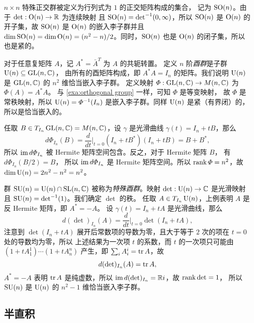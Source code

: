 \begin{example}[特殊正交群]
  $n\times n$ 特殊正交群被定义为行列式为 $1$ 的正交矩阵构成的集合，
  记为 $\operatorname{SO}(n)$。由于 $\det:\operatorname{O}(n)\to \mathbb{R}$ 为连续映射
  且 $\operatorname{SO}(n)=\det^{-1}(0,\infty)$，所以 $\operatorname{SO}(n)$ 是 $\operatorname{O}(n)$
  的开子集，故 $\operatorname{SO}(n)$ 是 $\operatorname{O}(n)$ 的嵌入李子群并且
  $\dim \operatorname{SO}(n)=\dim\operatorname{O}(n)=(n^2-n)/2$。同时，$\operatorname{SO}(n)$
  也是 $\operatorname{O}(n)$ 的闭子集，所以也是紧的。
\end{example}

\begin{example}[酉群]
  对于任意复矩阵 $A$，记 $A^*=\bar A ^T$ 为 $A$ 的共轭转置。
  定义 $n$ 阶\emph{酉群}是子群 $\operatorname{U}(n)\subseteq \operatorname{GL}(n,\mathbb{C})$，
  由所有的酉矩阵构成，即 $A^*A=I_n$ 的矩阵。我们说明 $\operatorname{U}(n)$ 是 $\operatorname{GL}(n,\mathbb{C})$
  的 $n^2$ 维恰当嵌入李子群。
  定义映射 $\varPhi:\operatorname{GL}(n,\mathbb{C})\to M(n,\mathbb{C})$ 为 $\varPhi(A)=A^*A$。
  与 \autoref{exa:orthogonal group} 一样，可知 $\varPhi$ 是等变映射，
  故 $\varPhi$ 是常秩映射，所以 $\operatorname{U}(n)=\varPhi^{-1}(I_n)$
  是嵌入李子群。同样 $\operatorname{U}(n)$ 是紧（有界闭）的，所以是恰当嵌入的。

  任取 $B\in T_{I_n}\operatorname{GL}(n,\mathbb{C})=M(n,\mathbb{C})$，设 $\gamma$ 是光滑曲线
  $\gamma(t)=I_n+tB$，那么 
  \[
    d\varPhi_{I_n}(B)=\frac{d}{dt}\bigg|_{t=0}(I_n+tB^*)(I_n+tB)=B+B^*,
  \]
  所以 $\operatorname{im} d\varPhi_{I_n}$ 被 Hermite 矩阵空间包含。反之，对于 Hermite 矩阵 $B$，
  有 $d\varPhi_{I_n}(B/2)=B$，
  所以 $\operatorname{im} d\varPhi_{I_n}$ 是 Hermite 矩阵空间。所以 $\operatorname{rank} \varPhi=n^2$，故 
  $\dim \operatorname{U}(n)=2n^2-n^2=n^2$。
\end{example}

\begin{example}[特殊酉群]
  群 $\operatorname{SU}(n)=\operatorname{U}(n)\cap\operatorname{SL}(n,\mathbb{C})$ 被称为\emph{特殊酉群}。映射
  $\det:\operatorname{U}(n)\to \mathbb{C}$ 是光滑映射且 $\operatorname{SU}(n)=\det^{-1}(1)$。我们确定 $\det$ 的秩。
  任取 $A\in T_{I_n}\operatorname{U}(n)$，上例表明 $A$ 是反 Hermite 矩阵，即 $A^*=-A$。
  设 $\gamma(t)=I_n+tA$ 是光滑曲线，那么
  \[
    d(\det)_{I_n}(A)=\frac{d}{dt}\bigg|_{t=0}\det(I_n+tA), 
  \]
  注意到 $\det(I_n+tA)$ 展开后常数项的导数为零，且大于等于 $2$ 次的项在 $t=0$ 处的导数均为零，所以
  上述结果为一次项 $t$ 的系数，而 $t$ 的一次项只可能由 $(1+tA_1^1)\cdots (1+tA_n^n)$
  产生，即 $\sum_iA_i^i=\operatorname{tr} A$，故
  \[
    d(\det)_{I_n}(A)=\operatorname{tr} A,
  \]
  $A^*=-A$ 表明 $\operatorname{tr} A$ 是纯虚数，所以 $\operatorname{im} d(\det)_{I_n}= \mathbb{R}i$，故 $\operatorname{rank}\det =1$，
  所以 $\operatorname{SU}(n)$ 是 $\operatorname{U}(n)$ 的 $n^2-1$ 维恰当嵌入李子群。
\end{example}

\subsection{半直积}




